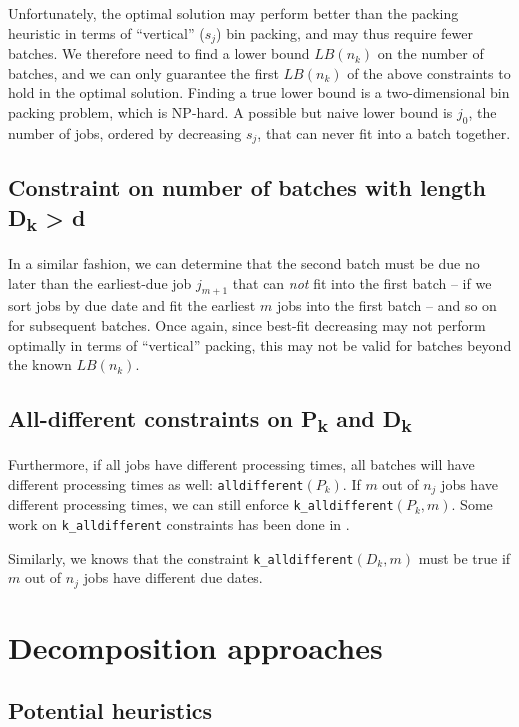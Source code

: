 \documentclass[13pt, letterpaper, oneside]{book}
\begin{document}
Unfortunately, the optimal solution may perform better than the packing heuristic in
terms of ``vertical'' ($s_j$) bin packing, and may thus require fewer batches.
We therefore need to find a lower bound $LB(n_k)$ on the number of batches, and
we can only guarantee the first $LB(n_k)$ of the above constraints to hold in
the optimal solution. Finding a true lower bound is a two-dimensional bin
packing problem, which is NP-hard. A possible but naive lower bound is $j_0$,
the number of jobs, ordered by decreasing $s_j$, that can never fit into a batch
together.

\subsection[Constraint on the number of batches with due date $D_k >
d$]{Constraint on number of batches with length {\sansitalicfont
D\textsubscript{k}} > {\sansitalicfont d}}

In a similar fashion, we can determine that the second batch must be due no
later than the earliest-due job $j_{m+1}$ that can \textit{not} fit into the first
batch -- if we sort jobs by due date and fit the earliest $m$ jobs into the first
batch -- and so on for subsequent batches. Once again, since best-fit decreasing
may not perform optimally in terms of ``vertical'' packing, this may not be
valid for batches beyond the known $LB(n_k)$.

\subsection[All-different constraints on $P_k$ and $D_k$]{All-different
constraints on {\sansitalicfont P\textsubscript{k}} and {\sansitalicfont
D\textsubscript{k}}}

Furthermore, if all jobs have different processing times, all batches will have
different processing times as well: \texttt{alldifferent}$(P_k)$. If $m$ out of
$n_j$ jobs have different processing times, we can still enforce
\texttt{k\_alldifferent}$(P_k, m)$. Some work on \texttt{k\_alldifferent}
constraints has been done in \citep{Lardeux}. 

Similarly, we knows that the constraint \texttt{k\_alldifferent}$(D_k, m)$ must
be true if $m$ out of $n_j$ jobs have different due dates.

\section{Decomposition approaches}
\subsection{Potential heuristics}
\end{document}
